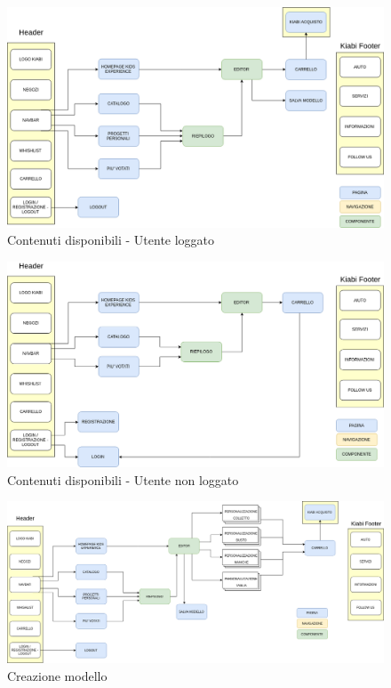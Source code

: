 \documentclass[12pt,italian,]{report}
\begin{document}
\begin{figure}[h]
\centering
\includegraphics{img/Utente_loggato.png}
\caption{Contenuti disponibili - Utente loggato}
\label{utente loggato}
\end{figure}

\begin{figure}[h]
\centering
\includegraphics{img/Utente_non_loggato.png}
\caption{Contenuti disponibili - Utente non loggato}
\label{utente non loggato}
\end{figure}

\begin{figure}[h]
\centering
\includegraphics{img/Creazione_modello.png}
\caption{Creazione modello}
\label{creazione modello}
\end{figure}
\end{document}
